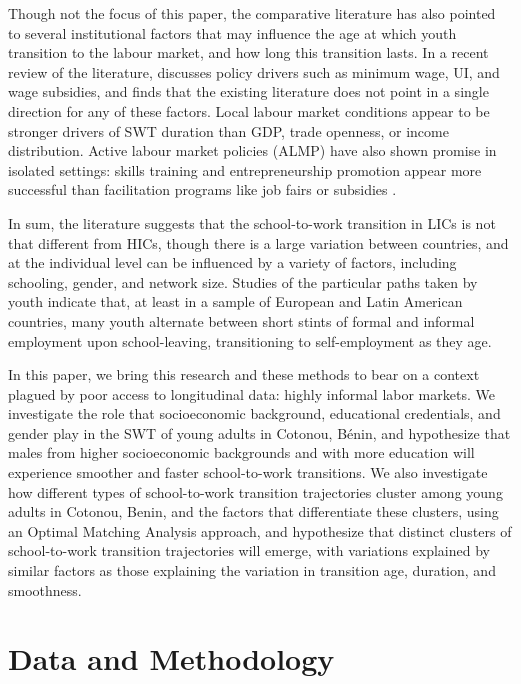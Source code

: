 \documentclass[
  a4paper, twoside, 12pt]{book}
\renewcommand{\hl}[1]{#1}
\begin{document}
Though not the focus of this paper, the comparative literature has also pointed to several institutional factors that may influence the age at which youth transition to the labour market, and how long this transition lasts. In a recent review of the literature, \textcite{nilsson2019} discusses policy drivers such as minimum wage, UI, and wage subsidies, and finds that the existing literature does not point in a single direction for any of these factors. Local labour market conditions appear to be stronger drivers of SWT duration than GDP, trade openness, or income distribution. Active labour market policies (ALMP) have also shown promise in isolated settings: skills training and entrepreneurship promotion appear more successful than facilitation programs like job fairs or subsidies \autocite{mckenzie2017}.

In sum, the literature suggests that the school-to-work transition in LICs is not that different from HICs, though there is a large variation between countries, and at the individual level can be influenced by a variety of factors, including schooling, gender, and network size. Studies of the particular paths taken by youth indicate that, at least in a sample of European and Latin American countries, many youth alternate between short stints of formal and informal employment upon school-leaving, transitioning to self-employment as they age.

 \hl{In this paper, we bring this research and these methods to bear on a context plagued by poor access to longitudinal data: highly informal labor markets. We investigate the role that socioeconomic background, educational credentials, and gender play in the SWT of young adults in Cotonou, Bénin, and hypothesize that males from higher socioeconomic backgrounds and with more education will experience smoother and faster school-to-work transitions. We also investigate how different types of school-to-work transition trajectories cluster among young adults in Cotonou, Benin, and the factors that differentiate these clusters, using an Optimal Matching Analysis approach, and hypothesize that distinct clusters of school-to-work transition trajectories will emerge, with variations explained by similar factors as those explaining the variation in transition age, duration, and smoothness.}

\hypertarget{survey-datamethods}{%
\section{Data and Methodology}\label{survey-datamethods}}
\end{document}

